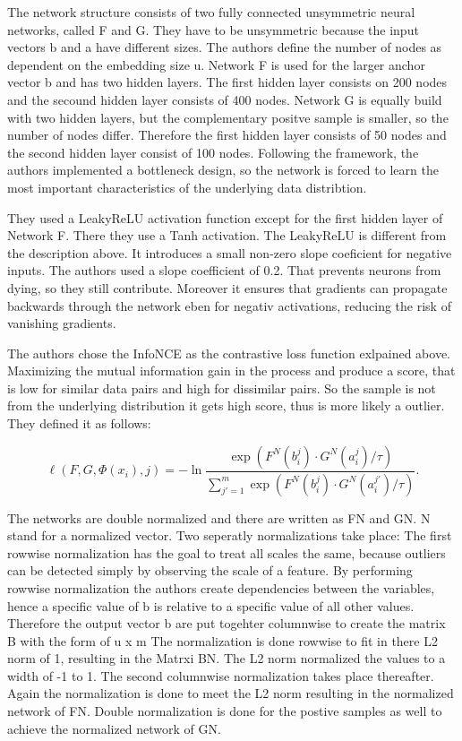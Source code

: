 The network structure consists of two fully connected unsymmetric neural networks, called F and G. 
They have to be unsymmetric because the input vectors b and a have different sizes.
The authors define the number of nodes as dependent on the embedding size u.
Network F is used for the larger anchor vector b and has two hidden layers. 
The first hidden layer consists on 200 nodes and the secound hidden layer consists of 400 nodes.
Network G is equally build with two hidden layers, but the complementary positve sample is smaller, so the number of nodes differ.
Therefore the first hidden layer consists of 50 nodes and the second hidden layer consist of 100 nodes.
Following the framework, the authors implemented a bottleneck design, so the network is forced to learn the most important characteristics of the underlying data distribtion.


They used a LeakyReLU activation function except for the first hidden layer of Network F.
There they use a Tanh activation. 
The LeakyReLU is different from the description above.  
It introduces a small non-zero slope coeficient for negative inputs. 
The authors used a slope coefficient of 0.2.
That prevents neurons from dying, so they still contribute. 
Moreover it ensures that gradients can propagate backwards through the network eben for negativ activations, reducing the risk of vanishing gradients. 


The authors chose the InfoNCE as the contrastive loss function exlpained above.
Maximizing the mutual information gain in the process and produce a score, that is low for similar data pairs and high for dissimilar pairs.
So the sample is not from the underlying distribution it gets high score, thus is more likely a outlier. 
They defined it as follows:


\begin{equation}
   \ell(F, G, \Phi(x_i), j) = -\ln \frac{\exp(F^N(b_i^j) \cdot G^N(a_i^j) / \tau)}{\sum_{j'=1}^{m} \exp(F^N(b_i^j) \cdot G^N(a_i^{j'}) / \tau)}.
\end{equation}


The networks are double normalized and there are written as FN and GN. 
N stand for a normalized vector. 
Two seperatly normalizations take place:
The first rowwise normalization has the goal to treat all scales the same, because outliers can be detected simply by observing the scale of a feature. 
By performing rowwise normalization the authors create dependencies between the variables, hence a specific value of b is relative to a specific value of all other values. 
Therefore the output vector b are put togehter columnwise to create the matrix B with the form of u x m
The normalization is done rowwise to fit in there L2 norm of 1, resulting in the Matrxi BN. 
The L2 norm normalized the values to a width of -1 to 1.
The second columnwise normalization takes place thereafter.
Again the normalization is done to meet the L2 norm resulting in the normalized network of FN.
Double normalization is done for the postive samples as well to achieve the normalized network of GN.

